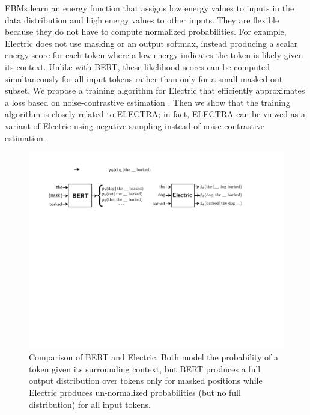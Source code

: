 \documentclass[11pt,a4paper]{article}
\begin{document}
EBMs learn an energy function that assigns low energy values to inputs in the data distribution and high energy values to other inputs.  
They are flexible because they do not have to compute normalized probabilities. 
For example, Electric does not use masking or an output softmax, instead producing a scalar energy score for each token where a low energy indicates the token is likely given its context.
Unlike with BERT, these likelihood scores can be computed simultaneously for all input tokens rather than only for a small masked-out subset. 
We propose a training algorithm for Electric that efficiently approximates a loss based on noise-contrastive estimation \citep{Gutmann2010NoisecontrastiveEA}. 
Then we show that the training algorithm is closely related to ELECTRA; in fact, ELECTRA can be viewed as a variant of Electric using negative sampling instead of noise-contrastive estimation.


\begin{figure}[tb]
\begin{center}
\includegraphics[width=1.0\textwidth]{fig/electric_cropped.pdf}
\end{center}
\caption{Comparison of BERT and Electric\@. Both model the probability of a token given its surrounding context, but BERT produces a full output distribution over tokens only for masked positions while Electric produces un-normalized probabilities (but no full distribution) for all input tokens.}
\vspace{-1mm}
\label{fig:overview}
\end{figure}
\end{document}
